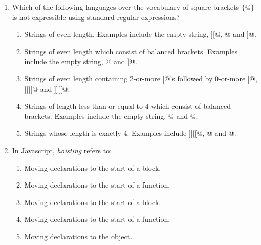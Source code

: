 \documentclass[12pt]{article}
\begin{document}
\begin{enumerate}

\item Which of the following languages over the vocabulary of
  square-brackets $\{$\verb@[@, \verb@]@$\}$ is not expressible using
  standard regular expressions?

\begin{enumerate}

\item Strings of even length.  Examples include
  the empty string, \verb@][@, \verb@[[[]@ and \verb@[[]]@.

\item Strings of even length which consist of balanced brackets.
  Examples include the empty string, \verb@[]@ and \verb@[][[]]@.

\item Strings of even length containing 2-or-more \verb@]@'s
  followed by 0-or-more ]@,
  \verb@]]][@ and \verb@]][[@.

\item Strings of length less-than-or-equal-to 4 which consist of
  balanced brackets. 
    Examples include the empty string, \verb@[]@ and \verb@[][]@.

\item Strings whose length is exactly 4.  Examples include \verb@]][[@,
  \verb@[[[]@ and \verb@[][]@.
  
\end{enumerate}

\item In Javascript, \textit{hoisting} refers to:
\begin{enumerate}

\item Moving \verb@let@ declarations to the start
  of a block.

\item Moving \verb@let@ declarations to the start
  of a function.

\item Moving \verb@var@ declarations to the start
  of a block.

\item Moving \verb@var@ declarations to the start
  of a function.

\item Moving \verb@var@ declarations to the \verb@window@ object.

\end{enumerate}


\end{enumerate}
\end{document}
